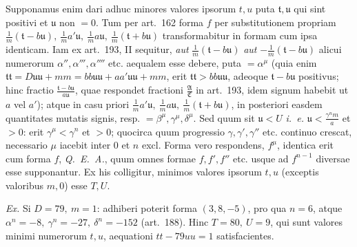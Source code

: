 Supponamus enim dari adhuc minores valores ipsorum \(t,u\) puta \(\mathfrak{t},\mathfrak{u}\) qui sint positivi et \(\mathfrak{u}\) non \(=0\). Tum per art.~162 forma \(f\) per substitutionem propriam \(\frac1m(\mathfrak{t}-b\mathfrak{u}),\ \frac1m a'\mathfrak{u},\ \frac1m a\mathfrak{u},\ \frac1m(\mathfrak{t}+b\mathfrak{u})\) transformabitur in formam cum ipsa
identicam. Iam ex art.~193, II sequitur, \textit{aut} \(\frac1m(\mathfrak{t}-b\mathfrak{u})\) \textit{aut} \(-\frac1m(\mathfrak{t}-b\mathfrak{u})\) alicui numerorum \(\alpha'',\alpha''',\alpha''''\) etc. aequalem esse debere, puta \(=\alpha^\mu\) (quia enim \(\mathfrak{tt}=D\mathfrak{uu}+mm=bb\mathfrak{uu}+aa'\mathfrak{uu}+mm\), erit \(\mathfrak{tt}>bb\mathfrak{uu}\), adeoque \(\mathfrak{t}-b\mathfrak{u}\) positivus; hinc fractio \(\frac{\mathfrak{t}-b\mathfrak{u}}{a\mathfrak{u}}\), quae respondet fractioni \(\frac{\mathfrak{A}}{\mathfrak{C}}\) in art.~193, idem signum habebit ut \(a\) vel \(a'\)); atque in casu priori \(\frac1m a'\mathfrak{u},\ \frac1m a\mathfrak{u},\ \frac1m(\mathfrak{t}+b\mathfrak{u})\), in posteriori easdem quantitates mutatis signis, resp. \(=\beta^\mu,\gamma^\mu,\delta^\mu\). Sed quum sit \(\mathfrak{u}<U\) \textit{i.~e.} \(\mathfrak{u}<\frac{\gamma^n m}{a}\) et \(>0\): erit \(\gamma^\mu<\gamma^n\) et \(>0\); quocirca quum progressio \(\gamma,\gamma',\gamma''\) etc. continuo crescat, necessario \(\mu\) iacebit inter \(0\) et \(n\) excl. Forma vero respondens, \(f^\mu\), identica erit cum forma \(f\), \textit{Q.~E.~A.}, quum omnes formae \(f,f',f''\) etc. usque ad \(f^{n-1}\) diversae esse supponantur. Ex his colligitur, minimos valores ipsorum \(t,u\) (exceptis valoribus \(m,0\)) esse \(T,U\).

\textit{Ex.} Si \(D=79,\ m=1\): adhiberi poterit forma \((3,8,-5)\), pro qua \(n=6\), atque \(\alpha^n=-8,\ \gamma^n=-27,\ \delta^n=-152\) (art.~188). Hinc \(T=80,\ U=9\), qui sunt valores minimi numerorum \(t,u\), aequationi \(tt-79uu=1\) satisfacientes.

